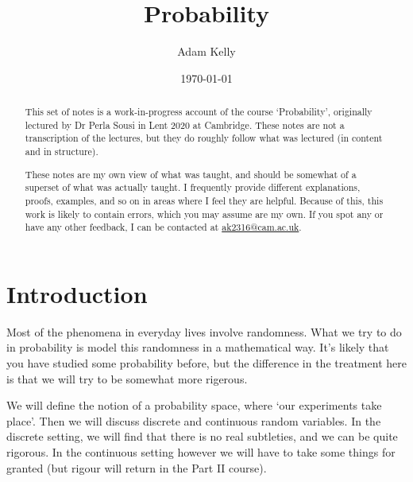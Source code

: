 \documentclass[a4paper]{scrreprt}
\title{Probability}
\author{Adam Kelly}
\date{\today}
\begin{document}
\maketitle

\begin{abstract}
	

	This set of notes is a work-in-progress account of the course `Probability', originally lectured by Dr Perla Sousi in Lent 2020 at Cambridge. These notes are not a transcription of the lectures, but they do roughly follow what was lectured (in content and in structure).

	These notes are my own view of what was taught, and should be somewhat of a superset of what was actually taught. I frequently provide different explanations, proofs, examples, and so on in areas where I feel they are helpful. Because of this, this work is likely to contain errors, which you may assume are my own. If you spot any or have any other feedback, I can be contacted at \href{mailto:ak2316@cam.ac.uk}{ak2316@cam.ac.uk}.



\end{abstract}

\tableofcontents

\clearpage
\chapter{Introduction}

Most of the phenomena in everyday lives involve randomness. What we try to do in probability is model this randomness in a mathematical way. It's likely that you have studied some probability before, but the difference in the treatment here is that we will try to be somewhat more rigerous.

We will define the notion of a probability space, where `our experiments take place'. Then we will discuss discrete and continuous random variables. 
In the discrete setting, we will find that there is no real subtleties, and we can be quite rigorous. In the continuous setting however we will have to take some things for granted (but rigour will return in the Part II course).
\end{document}

